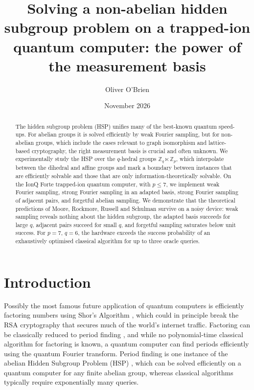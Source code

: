 \documentclass[aps,floatfix,10pt,amssymb,amsfont,amsmath,superscriptaddress,float,nofootinbib,longbibliography,nobalancelastpage,twocolumn]{revtex4-2}
\begin{document}
\author{Oliver O'Brien}
\title{Solving a non-abelian hidden subgroup problem on a trapped-ion\\ quantum computer: the power of the measurement basis}
\date{November 2026}
\begin{abstract}
The hidden subgroup problem (HSP) unifies many of the best-known quantum speed-ups. For abelian groups it is solved efficiently by weak Fourier sampling, but for non-abelian groups, which include the cases relevant to graph isomorphism and lattice-based cryptography, the right measurement basis is crucial and often unknown. We experimentally study the HSP over the $q$-hedral groups $\mathbb{Z}_q \ltimes \mathbb{Z}_p$, which interpolate between the dihedral and affine groups and mark a boundary between instances that are efficiently solvable and those that are only information-theoretically solvable. On the IonQ Forte trapped-ion quantum computer, with $p \le 7$, we implement weak Fourier sampling, strong Fourier sampling in an adapted basis, strong Fourier sampling of adjacent pairs, and forgetful abelian sampling. We demonstrate that the theoretical predictions of Moore, Rockmore, Russell and Schulman \cite{moore2007power} survive on a noisy device: weak sampling reveals nothing about the hidden subgroup, the adapted basis succeeds for large $q$, adjacent pairs succeed for small $q$, and forgetful sampling saturates below unit success. For $p=7$, $q=6$, the hardware exceeds the success probability of an exhaustively optimised classical algorithm for up to three oracle queries.
\end{abstract}
\maketitle
\section{Introduction}
Possibly the most famous future application of quantum computers is efficiently factoring numbers using Shor's Algorithm \cite{shor1999polynomial}, which could in principle break the RSA cryptography \cite{rivest1978method} that secures much of the world’s internet traffic. Factoring can be classically reduced to period finding \cite{shor1999polynomial}, and while no polynomial-time classical algorithm for factoring is known, a quantum computer can find periods efficiently using the quantum Fourier transform. Period finding is one instance of the abelian Hidden Subgroup Problem (HSP) \cite{kitaev1995quantum}, which can be solved efficiently on a quantum computer for any finite abelian group, whereas classical algorithms typically require exponentially many queries.
\end{document}
